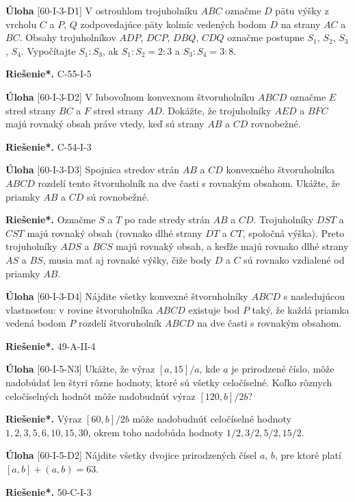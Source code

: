 \documentclass{article}
\newcommand{\rieh}{\textbf{Riešenie*.} }
\newcommand{\problem}[4]{
  \begin{tcolorbox}[breakable,notitle,boxrule=0pt,colback=light-gray,colframe=light-gray]
    \textbf{Úloha}
    [#1] #3
  \end{tcolorbox}
  \noindent#4
}
\begin{document}
\problem{60-I-3-D1}{}{
V ostrouhlom trojuholníku $ABC$ označme $D$ pätu výšky z vrcholu $C$ a $P$, $Q$ zodpovedajúce päty kolmíc vedených bodom $D$ na strany $AC$ a $BC$. Obsahy trojuholníkov $ADP$, $DCP$, $DBQ$, $CDQ$ označme postupne $S_1$, $S_2$, $S_3$, $S_4$. Vypočítajte $S_1 : S_3$, ak $S_1 : S_2 = 2 : 3$ a $S_3 : S_4 = 3 : 8$.
}{
\rieh C-55-I-5
}

\problem{60-I-3-D2}{}{
V ľubovoľnom konvexnom štvoruholníku $ABCD$ označme $E$ stred strany $BC$ a $F$ stred strany $AD$. Dokážte, že trojuholníky $AED$ a $BFC$ majú rovnaký obsah práve vtedy, keď sú strany $AB$ a $CD$ rovnobežné.
}
{\rieh C-54-I-3}


\problem{60-I-3-D3}{}{
Spojnica stredov strán $AB$ a $CD$ konvexného štvoruholníka $ABCD$ rozdelí tento štvoruholník na dve časti s rovnakým obsahom. Ukážte, že priamky $AB$ a $CD$ sú rovnobežné.
}{
\rieh Označme $S$ a $T$ po rade stredy strán $AB$ a $CD$. Trojuholníky $DST$ a $CST$ majú rovnaký obsah (rovnako dlhé strany $DT$ a $CT$, spoločná výška). Preto trojuholníky $ADS$ a $BCS$ majú rovnaký obsah, a keďže majú rovnako dlhé strany $AS$ a $BS$, musia mať aj rovnaké výšky, čiže body $D$ a $C$ sú rovnako vzdialené od priamky $AB$.
}


\problem{60-I-3-D4}{}{
Nájdite všetky konvexné štvoruholníky $ABCD$ s nasledujúcou vlastnosťou: v rovine štvoruholníka $ABCD$ existuje bod $P$ taký, že každá priamka vedená bodom $P$ rozdelí štvoruholník $ABCD$ na dve časti s rovnakým obsahom.
}{
\rieh 49-A-II-4
}


\problem{60-I-5-N3}{}{
Ukážte, že výraz $[a, 15]/a$, kde $a$ je prirodzené číslo, môže nadobúdať len štyri rôzne hodnoty, ktoré sú všetky celočíselné. Koľko rôznych celočíselných hodnôt môže nadobudnúť výraz $[120, b]/2b$?
}{
\rieh Výraz $[60, b]/2b$ môže nadobudnúť celočíselné hodnoty $1, 2,3, 5, 6, 10, 15, 30$, okrem toho nadobúda hodnoty $1/2, 3/2, 5/2, 15/2$.
}



\problem{60-I-5-D2}{}{
Nájdite všetky dvojice prirodzených čísel $a$, $b$, pre ktoré platí $[a, b] + (a, b) = 63$.
}{
\rieh 50-C-I-3
}
\end{document}
